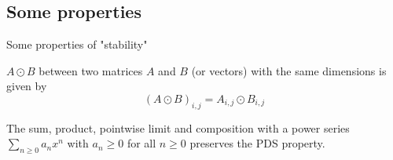 \documentclass[xcolor={usenames,dvipsnames}]{beamer}
\begin{document}
   
\subsection{Some properties}

\begin{frame}{Some properties of "stability"}


\begin{definition} 
$A \odot B$ between two matrices $A$ and $B$ (or vectors) with the same dimensions is given by
  \begin{equation*}
    (A \odot B)_{i, j} = A_{i, j} \odot  B_{i, j}
  \end{equation*}
\end{definition}
 

\begin{theorem} The sum, product, pointwise limit and composition with a power series $\sum_{n \geq 0} a_n x^n$ with $a_n \geq 0$ for all $n \geq 0$ preserves the PDS property.
\end{theorem}

\end{frame}
\end{document}
